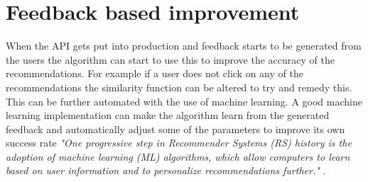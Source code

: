 \section{Feedback based improvement}
When the API gets put into production and feedback starts to be generated from the users the algorithm can start to use this to improve the accuracy of the recommendations. For example if a user does not click on any of the recommendations the similarity function can be altered to try and remedy this. This can be further automated with the use of machine learning. A good machine learning implementation can make the algorithm learn from the generated feedback and automatically adjust some of the parameters to improve its own success rate \textit{"One  progressive  step  in  Recommender Systems (RS) history  is  the  adoption  of  machine  learning  (ML) algorithms, which allow computers to learn based on user information and to personalize recommendations  further."} \cite{RSAndML}. 

